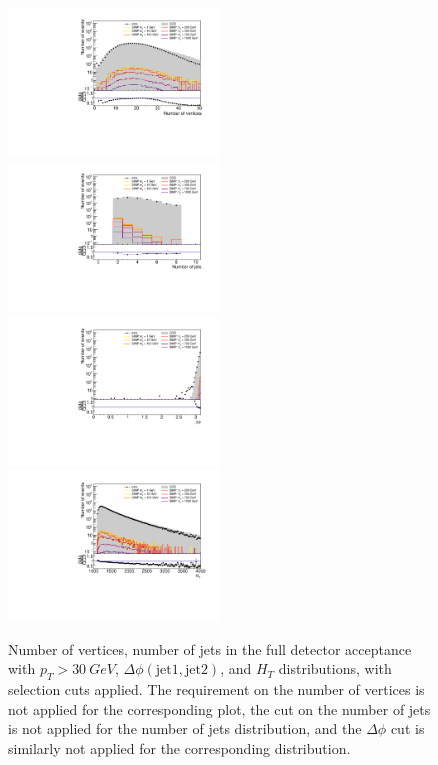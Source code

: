 \begin{figure}[ht]
  \centering
  \includegraphics[width=0.5\textwidth]{figures/nvtx_neutrons}\hfill%
  \includegraphics[width=0.5\textwidth]{figures/njets_neutrons}
  \includegraphics[width=0.5\textwidth]{figures/deltaphi_neutrons}\hfill
  \includegraphics[width=0.5\textwidth]{figures/HT_neutrons}
  \caption{Number of vertices, number of jets in the full detector acceptance with $p_T > \SI{30}{GeV}$, $\Delta\phi (\mathrm{jet}1, \mathrm{jet}2)$, and $H_{T}$ distributions, with selection cuts applied. The requirement on the number of vertices is not applied for the corresponding plot, the cut on the number of jets is not applied for the number of jets distribution, and the $\Delta\phi$ cut is similarly not applied for the corresponding distribution.}
  \label{fig:event_selection_2}
\end{figure}

